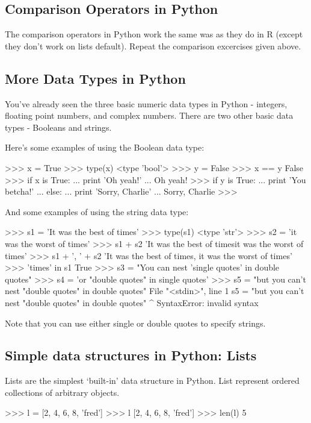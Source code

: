 \subsection{Comparison Operators in Python}

The comparison operators in Python work the same was as they do in R
(except they don't work on lists default). Repeat the comparison
excercises given above.

\subsection{More Data Types in Python}

You've already seen the three basic numeric data types in Python -
integers, floating point numbers, and complex numbers. There are two
other basic data types - Booleans and strings.

Here's some examples of using the Boolean data type:

\begin{python}
>>> x = True
>>> type(x)
<type 'bool'>
>>> y = False
>>> x == y
False
>>> if x is True:
...     print 'Oh yeah!'
... 
Oh yeah!
>>> if y is True:
...     print 'You betcha!'
... else:
...     print 'Sorry, Charlie'
... 
Sorry, Charlie
>>>
\end{python}
%
And some examples of using the string data type:
%
\begin{python}
>>> s1 = 'It was the best of times'
>>> type(s1)
<type 'str'>
>>> s2 = 'it was the worst of times'
>>> s1 + s2
'It was the best of timesit was the worst of times'
>>> s1 + ', ' + s2
'It was the best of times, it was the worst of times'
>>> 'times' in s1
True
>>> s3 = "You can nest 'single quotes' in double quotes"
>>> s4 = 'or "double quotes" in single quotes'
>>> s5 = "but you can't nest "double quotes" in double quotes"
  File "<stdin>", line 1
    s5 = "but you can't nest "double quotes" in double quotes"
                                   ^
SyntaxError: invalid syntax
\end{python}
%
Note that you can use either single or double quotes to specify strings.

\subsection{Simple data structures in Python: Lists}

Lists are the simplest `built-in' data structure in Python. List
represent ordered collections of arbitrary objects.
%
\begin{python}
>>> l = [2, 4, 6, 8, 'fred']
>>> l
[2, 4, 6, 8, 'fred']
>>> len(l)
5
\end{python}

